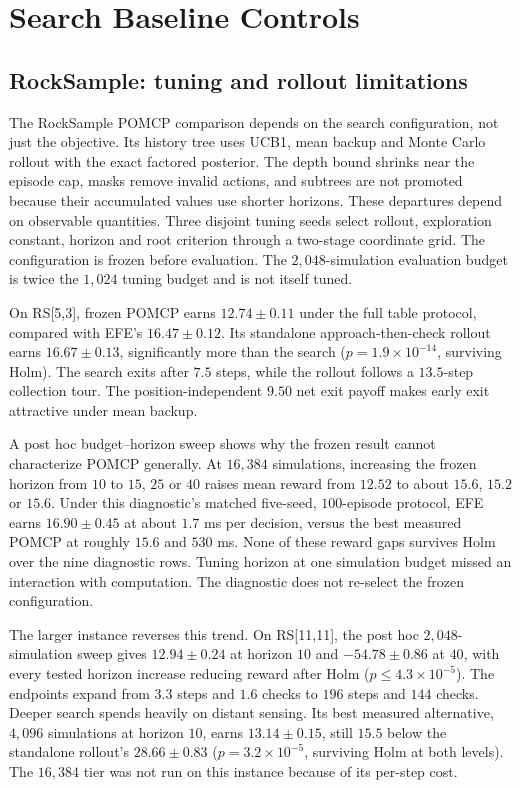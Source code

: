 \FloatBarrier

\section{Search Baseline Controls}

\subsection{RockSample: tuning and rollout limitations}
\label{app:rocksample}

The RockSample POMCP comparison depends on the search configuration, not just the objective. Its history tree uses UCB1, mean backup and Monte Carlo rollout with the exact factored posterior. The depth bound shrinks near the episode cap, masks remove invalid actions, and subtrees are not promoted because their accumulated values use shorter horizons. These departures depend on observable quantities. Three disjoint tuning seeds select rollout, exploration constant, horizon and root criterion through a two-stage coordinate grid. The configuration is frozen before evaluation. The $2{,}048$-simulation evaluation budget is twice the $1{,}024$ tuning budget and is not itself tuned.

On RS[5,3], frozen POMCP earns $12.74\pm0.11$ under the full table protocol, compared with EFE's $16.47\pm0.12$. Its standalone approach-then-check rollout earns $16.67\pm0.13$, significantly more than the search ($p=1.9\times10^{-14}$, surviving Holm). The search exits after $7.5$ steps, while the rollout follows a $13.5$-step collection tour. The position-independent $9.50$ net exit payoff makes early exit attractive under mean backup.

A post hoc budget--horizon sweep shows why the frozen result cannot characterize POMCP generally. At $16{,}384$ simulations, increasing the frozen horizon from $10$ to $15$, $25$ or $40$ raises mean reward from $12.52$ to about $15.6$, $15.2$ or $15.6$. Under this diagnostic's matched five-seed, $100$-episode protocol, EFE earns $16.90\pm0.45$ at about $1.7$ ms per decision, versus the best measured POMCP at roughly $15.6$ and $530$ ms. None of these reward gaps survives Holm over the nine diagnostic rows. Tuning horizon at one simulation budget missed an interaction with computation. The diagnostic does not re-select the frozen configuration.

The larger instance reverses this trend. On RS[11,11], the post hoc $2{,}048$-simulation sweep gives $12.94\pm0.24$ at horizon $10$ and $-54.78\pm0.86$ at $40$, with every tested horizon increase reducing reward after Holm ($p\le4.3\times10^{-5}$). The endpoints expand from $3.3$ steps and $1.6$ checks to $196$ steps and $144$ checks. Deeper search spends heavily on distant sensing. Its best measured alternative, $4{,}096$ simulations at horizon $10$, earns $13.14\pm0.15$, still $15.5$ below the standalone rollout's $28.66\pm0.83$ ($p=3.2\times10^{-5}$, surviving Holm at both levels). The $16{,}384$ tier was not run on this instance because of its per-step cost.

